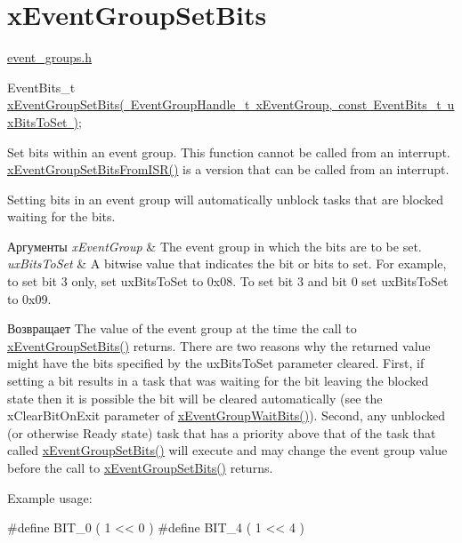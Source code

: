 \hypertarget{group__x_event_group_set_bits}{}\section{x\+Event\+Group\+Set\+Bits}
\label{group__x_event_group_set_bits}
\mbox{\hyperlink{event__groups_8h}{event\+\_\+groups.\+h}} 
\begin{DoxyPre}
   EventBits\_t \mbox{\hyperlink{event__groups_8h_a02d7b3bb55f7e11d9c47116266c5fb2e}{xEventGroupSetBits( EventGroupHandle\_t xEventGroup, const EventBits\_t uxBitsToSet )}};
\end{DoxyPre}


Set bits within an event group. This function cannot be called from an interrupt. \mbox{\hyperlink{event__groups_8h_a62b68278abac6358369ae8e390988a02}{x\+Event\+Group\+Set\+Bits\+From\+I\+S\+R()}} is a version that can be called from an interrupt.

Setting bits in an event group will automatically unblock tasks that are blocked waiting for the bits.


\begin{DoxyParams}{Аргументы}
{\em x\+Event\+Group} & The event group in which the bits are to be set.\\
\hline
{\em ux\+Bits\+To\+Set} & A bitwise value that indicates the bit or bits to set. For example, to set bit 3 only, set ux\+Bits\+To\+Set to 0x08. To set bit 3 and bit 0 set ux\+Bits\+To\+Set to 0x09.\\
\hline
\end{DoxyParams}
\begin{DoxyReturn}{Возвращает}
The value of the event group at the time the call to \mbox{\hyperlink{event__groups_8h_a02d7b3bb55f7e11d9c47116266c5fb2e}{x\+Event\+Group\+Set\+Bits()}} returns. There are two reasons why the returned value might have the bits specified by the ux\+Bits\+To\+Set parameter cleared. First, if setting a bit results in a task that was waiting for the bit leaving the blocked state then it is possible the bit will be cleared automatically (see the x\+Clear\+Bit\+On\+Exit parameter of \mbox{\hyperlink{event__groups_8h_aab9d5b405bc57b7624dcabe9a9a503db}{x\+Event\+Group\+Wait\+Bits()}}). Second, any unblocked (or otherwise Ready state) task that has a priority above that of the task that called \mbox{\hyperlink{event__groups_8h_a02d7b3bb55f7e11d9c47116266c5fb2e}{x\+Event\+Group\+Set\+Bits()}} will execute and may change the event group value before the call to \mbox{\hyperlink{event__groups_8h_a02d7b3bb55f7e11d9c47116266c5fb2e}{x\+Event\+Group\+Set\+Bits()}} returns.
\end{DoxyReturn}
Example usage\+: 
\begin{DoxyPre}
  \#define BIT\_0 ( 1 << 0 )
  \#define BIT\_4 ( 1 << 4 )\end{DoxyPre}



